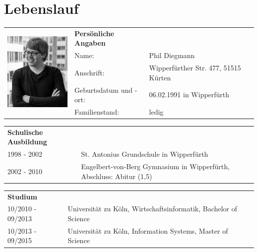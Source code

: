 \section*{\hspace{0.2cm}Lebenslauf} 

\begin{flushleft}

\begin{tabular}{p{11em} p{10em} p{10em}}
    \multirow{5}{*}{\includegraphics[width=40mm]{figures/passfoto.jpg}} & \textbf{Persönliche Angaben} & \addspace \\
    & Name: & Phil Diegmann \\
    & Anschrift: & Wipperfürther Str. 477, 51515 Kürten \\
    & Geburtsdatum und -ort: & 06.02.1991 in Wipperfürth \\
    & Familienstand: & ledig \\
\end{tabular}

\vspace{1.5em}

\begin{tabular}{p{11em} p{22.5em}}
    \textbf{Schulische Ausbildung} & \addspace \\
    1998 - 2002 & St. Antonius Grundschule in Wipperfürth \\
    2002 - 2010 & Engelbert-von-Berg Gymnasium in Wipperfürth, Abschluss: Abitur (1,5) \\
\end{tabular}

\vspace{0.5em}

\begin{tabular}{p{11em} p{22.5em}}
    \textbf{Studium} & \addspace \\
    10/2010 - 09/2013 & Universität zu Köln, Wirtschaftsinformatik, Bachelor of Science \\
    10/2013 - 09/2015 & Universität zu Köln, Information Systems, Master of Science
\end{tabular}


\vspace{-1em}



\end{flushleft}
